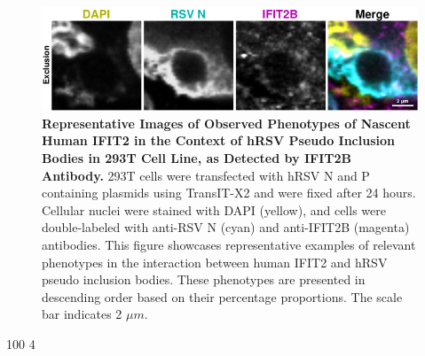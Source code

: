 \begin{figure}
    \centering
    \includegraphics[width=1\linewidth]{08. Chapter 3/Figs/03. pIB/03. IFIT2/03. IFIT2B/03. i2b-293t-hnhp.pdf} 
    \caption[Representative Images of Observed Phenotypes of Nascent Human IFIT2 in the Context of hRSV Pseudo Inclusion Bodies in 293T Cell Line, as Detected by IFIT2B Antibody.]{\textbf{Representative Images of Observed Phenotypes of Nascent Human IFIT2 in the Context of hRSV Pseudo Inclusion Bodies in 293T Cell Line, as Detected by IFIT2B Antibody.} 293T cells were transfected with hRSV N and P containing plasmids using TransIT-X2 and were fixed after 24 hours. Cellular nuclei were stained with DAPI (yellow), and cells were double-labeled with anti-RSV N (cyan) and anti-IFIT2B (magenta) antibodies. This figure showcases representative examples of relevant phenotypes in the interaction between human IFIT2 and hRSV pseudo inclusion bodies. These phenotypes are presented in descending order based on their percentage proportions. The scale bar indicates 2 \(\mu m\).}
    \label{fig:Representative Images of Observed Phenotypes of Nascent Human IFIT2 in the Context of hRSV Pseudo Inclusion Bodies in 293T Cell Line, as Detected by IFIT2B Antibody}
\end{figure}

100
4

